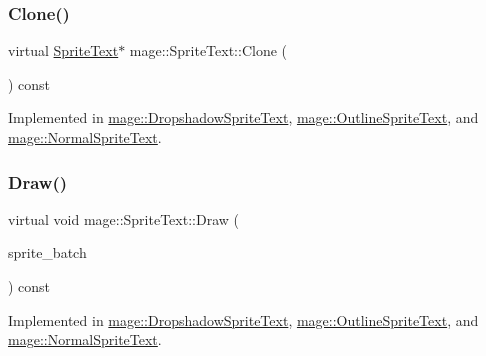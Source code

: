 \subsubsection{\texorpdfstring{Clone()}{Clone()}}
{\footnotesize\ttfamily virtual \hyperlink{classmage_1_1_sprite_text}{Sprite\+Text}$\ast$ mage\+::\+Sprite\+Text\+::\+Clone (\begin{DoxyParamCaption}{ }\end{DoxyParamCaption}) const\hspace{0.3cm}{\ttfamily [pure virtual]}}



Implemented in \hyperlink{classmage_1_1_dropshadow_sprite_text_a116c49fb9638414c67a09501c4031a01}{mage\+::\+Dropshadow\+Sprite\+Text}, \hyperlink{classmage_1_1_outline_sprite_text_a095a8ef1603b9045cecb6fd1263243be}{mage\+::\+Outline\+Sprite\+Text}, and \hyperlink{classmage_1_1_normal_sprite_text_aef48e90667849cd9ec01510baf1394cb}{mage\+::\+Normal\+Sprite\+Text}.

\hypertarget{classmage_1_1_sprite_text_a45d5ac8410d5a46b26e8491946a2ad9e}{}\label{classmage_1_1_sprite_text_a45d5ac8410d5a46b26e8491946a2ad9e} 
\subsubsection{\texorpdfstring{Draw()}{Draw()}}
{\footnotesize\ttfamily virtual void mage\+::\+Sprite\+Text\+::\+Draw (\begin{DoxyParamCaption}\item[{\hyperlink{classmage_1_1_sprite_batch}{Sprite\+Batch} \&}]{sprite\+\_\+batch }\end{DoxyParamCaption}) const\hspace{0.3cm}{\ttfamily [pure virtual]}}



Implemented in \hyperlink{classmage_1_1_dropshadow_sprite_text_af76422c9812d7dc38e9b98e587103c67}{mage\+::\+Dropshadow\+Sprite\+Text}, \hyperlink{classmage_1_1_outline_sprite_text_a524e9ad1caeeeaa32405e61d1a5e1032}{mage\+::\+Outline\+Sprite\+Text}, and \hyperlink{classmage_1_1_normal_sprite_text_ad2a1b02bea18afd6bf61b106a727a355}{mage\+::\+Normal\+Sprite\+Text}.

\hypertarget{classmage_1_1_sprite_text_ac974d6c3ce1c66165222df73a088b4e4}{}\label{classmage_1_1_sprite_text_ac974d6c3ce1c66165222df73a088b4e4} 

